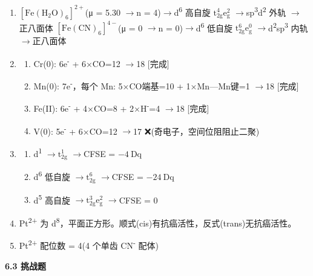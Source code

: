 \documentclass[a4paper,11pt]{ctexart}
\providecommand{\tightlist}{\setlength{\itemsep}{0pt}\setlength{\parskip}{0pt}}
\newcommand{\箭}{\ensuremath{\rightarrow}}
\newcommand{\左箭}{\ensuremath{\leftarrow}}
\newcommand{\上箭}{\ensuremath{\uparrow}}
\newcommand{\下箭}{\ensuremath{\downarrow}}
\newcommand{\衡}{\ensuremath{\rightleftharpoons}}
\newcommand{\双箭}{\ensuremath{\leftrightarrow}}
\newcommand{\约等于}{\ensuremath{\approx}}
\newcommand{\小于等于}{\ensuremath{\leq}}
\newcommand{\大于等于}{\ensuremath{\geq}}
\newcommand{\不等于}{\ensuremath{\neq}}
\newcommand{\西格马}{\ensuremath{\sigma}}
\newcommand{\派}{\ensuremath{\pi}}
\begin{document}
\begin{enumerate}
\def\labelenumi{\arabic{enumi}.}
\setcounter{enumi}{4}
\item
  \textbf{\([\mathrm{Fe(H_2O)_6}]^{2+}\)}(μ = 5.30 \箭 n = 4)\箭 d\textsuperscript{6} 高自旋 \(\mathrm{t_{2g}^4 e_g^2}\) \箭 sp\textsuperscript{3}d\textsuperscript{2} 外轨 \箭 正八面体
  \textbf{\([\mathrm{Fe(CN)_6}]^{4-}\)}(μ = 0 \箭 n = 0)\箭 d\textsuperscript{6} 低自旋 \(\mathrm{t_{2g}^6 e_g^0}\) \箭 d\textsuperscript{2}sp\textsuperscript{3} 内轨 \箭 正八面体
\item
  \begin{enumerate}
  \def\labelenumii{(\arabic{enumii})}
  \tightlist
  \item
    Cr(0): 6e\textsuperscript{-} + 6×CO=12 \箭 18 {[}完成{]}
  \item
    Mn(0): 7e\textsuperscript{-}，每个 Mn: 5×CO端基=10 + 1×Mn---Mn键=1 \箭 18 {[}完成{]}
  \item
    Fe(II): 6e\textsuperscript{-} + 4×CO=8 + 2×H\textsuperscript{-}=4 \箭 18 {[}完成{]}
  \item
    V(0): 5e\textsuperscript{-} + 6×CO=12 \箭 17 ❌(奇电子，空间位阻阻止二聚)
  \end{enumerate}
\item
  \begin{enumerate}
  \def\labelenumii{(\arabic{enumii})}
  \tightlist
  \item
    d\textsuperscript{1} \箭 \(\mathrm{t_{2g}^1}\) \箭 CFSE = \(-4\ \mathrm{Dq}\)
  \item
    d\textsuperscript{6} 低自旋 \箭 \(\mathrm{t_{2g}^6}\) \箭 CFSE = \(-24\ \mathrm{Dq}\)
  \item
    d\textsuperscript{5} 高自旋 \箭 \(\mathrm{t_{2g}^3 e_g^2}\) \箭 CFSE = 0
  \end{enumerate}
\item
  Pt\textsuperscript{2+} 为 d\textsuperscript{8}，平面正方形。顺式(cis)有抗癌活性，反式(trans)无抗癌活性。
\item
  Pt\textsuperscript{2+} 配位数 = 4(4 个单齿 CN\textsuperscript{-} 配体)
\end{enumerate}

\textbf{6.3 挑战题}
\end{document}
